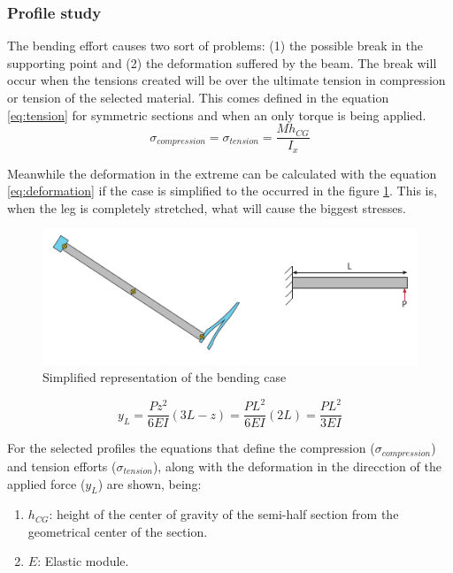 \subsubsection{Profile study} %
\label{ssub:profile_study}
  The bending effort causes two sort of problems: (1) the possible break in the supporting point and (2) the deformation suffered by the beam.
  The break will occur when the tensions created will be over the ultimate tension in compression or tension of the selected material.
  This comes defined in the equation \ref{eq:tension} for symmetric sections and when an only torque is being applied.
  \begin{equation}
  \label{eq:tension}
    \sigma _{compression} = \sigma _{tension} = \frac{M h_{CG}}{I_x}
  \end{equation}

  Meanwhile the deformation in the extreme can be calculated with the equation \ref{eq:deformation} if the case is simplified to the occurred in the figure \ref{fig:bending_case}.
  This is, when the leg is completely stretched, what will cause the biggest stresses.

  \begin{figure}[ht!]
    \centering
    \includegraphics[width=\textwidth]{figures/bending_case.pdf}
    \caption{Simplified representation of the bending case}
    \label{fig:bending_case}
  \end{figure}

  \begin{equation}
  \label{eq:deformation}
    y_L = \frac{P z^2}{6EI}(3L-z) = \frac{P L^2}{6EI}(2L) = \frac{P L^2}{3EI}
  \end{equation}


  For the selected profiles the equations that define the compression ($\sigma _{compression}$) and tension efforts ($\sigma _{tension}$), along with the deformation in the direcction of the applied force ($y_L$) are shown, being:

  \begin{enumerate}
    \item $h_{CG}$: height of the center of gravity of the semi-half section from the geometrical center of the section.

    \item $E$: Elastic module.
  \end{enumerate}


